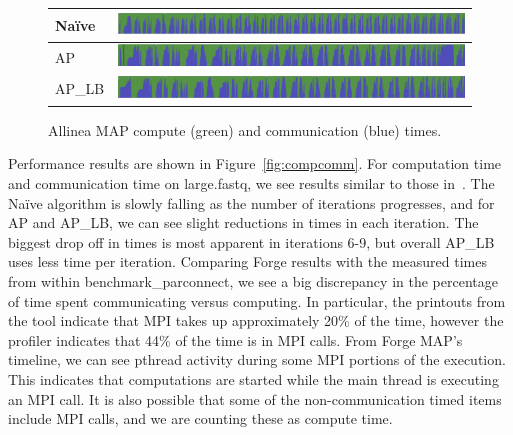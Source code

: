 \documentclass[11pt]{elsarticle}
\begin{document}
\begin{figure}[htp]
\centering
\label{my-label}
\begin{tabular}{|l|l|}
\hline
Na{\"i}ve & \includegraphics{naiveallinea} \\ \hline
AP & \includegraphics{apallinea} \\ \hline
AP\_LB & \includegraphics{aplballinea} \\ \hline
\end{tabular}
\caption{Allinea MAP compute (green) and communication (blue) times.}
\label{fig:alinea}
\end{figure}
Performance results are shown in Figure~\ref{fig:compcomm}.
For computation time and communication time on large.fastq, we see results similar to those in~\cite{Flick:2015}. The Na{\"i}ve algorithm is slowly falling as the number of iterations progresses, and for AP and AP\_LB, we can see slight reductions in times in each iteration. The biggest drop off in times is most apparent in iterations 6-9, but overall AP\_LB uses less time per iteration. Comparing Forge results with the measured times from within benchmark\_parconnect, we see a big discrepancy in the percentage of time spent communicating versus computing. In particular, the printouts from the tool indicate that MPI takes up approximately 20\% of the time, however the profiler indicates that 44\% of the time is in MPI calls. From Forge MAP's timeline, we can see pthread activity during some MPI portions of the execution. This indicates that computations are started while the main thread is executing an MPI call. It is also possible that some of the non-communication timed items include MPI calls, and we are counting these as compute time.
\end{document}
